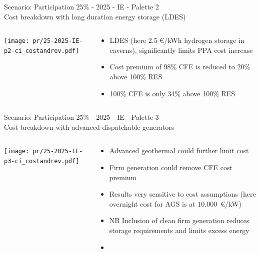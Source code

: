 \begin{frame}{Scenario: Participation 25\% - 2025 - IE - Palette 2 \\
Cost breakdown with long duration energy storage (LDES)}

\begin{columns}[T]
\begin{column}{9cm}
\centering

\texttt{[image: pr/25-2025-IE-p2-ci\_costandrev.pdf]}
\end{column}
\begin{column}{5cm}

  \vspace{.5cm}

  \begin{itemize}
  \item LDES (here 2.5 €/kWh hydrogen storage in caverns), significantly \alert{limits PPA cost increase}
  \item Cost premium of 98\% CFE is reduced to \alert{20\%} above 100\% RES
  \item 100\% CFE is \alert{only 34\%} above 100\% RES
  \end{itemize}
\end{column}
\end{columns}

\end{frame}


\begin{frame}{Scenario: Participation 25\% - 2025 - IE - Palette 3 \\
Cost breakdown with advanced dispatchable generators}

\begin{columns}[T]
\begin{column}{9cm}
\centering

\texttt{[image: pr/25-2025-IE-p3-ci\_costandrev.pdf]}
\end{column}
\begin{column}{5cm}


  \begin{itemize}
  \item Advanced geothermal could \alert{further limit cost}
  \item Firm generation could \alert{remove CFE cost premium}
  \item Results very \alert{sensitive} to cost assumptions (here overnight cost for AGS is at $10.000$~€/kW)
  \item NB Inclusion of clean firm generation reduces storage requirements and limits excess energy
  \item 
  \end{itemize}
\end{column}
\end{columns}

\end{frame}



